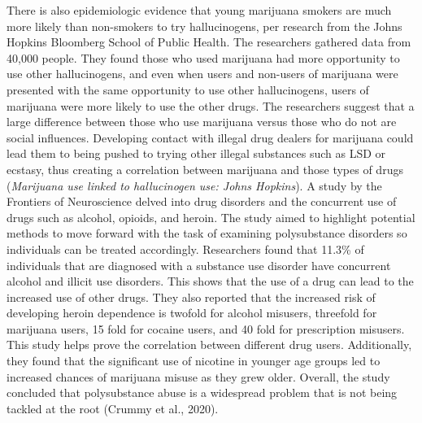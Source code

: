 \documentclass{article}
\begin{document}
There is also epidemiologic evidence that young marijuana smokers are much more likely than non-smokers to try hallucinogens, per research from the Johns Hopkins Bloomberg School of Public Health. The researchers gathered data from 40,000 people. They found those who used marijuana had more opportunity to use other hallucinogens, and even when users and non-users of marijuana were presented with the same opportunity to use other hallucinogens, users of marijuana were more likely to use the other drugs. The researchers suggest that a large difference between those who use marijuana versus those who do not are social influences. Developing contact with illegal drug dealers for marijuana could lead them to being pushed to trying other illegal substances such as LSD or ecstasy, thus creating a correlation between marijuana and those types of drugs ({\it Marijuana use linked to hallucinogen use: Johns Hopkins}).	
A study by the Frontiers of Neuroscience delved into drug disorders and the concurrent use of drugs such as alcohol, opioids, and heroin. The study aimed to highlight potential methods to move forward with the task of examining polysubstance disorders so individuals can be treated accordingly. Researchers found that 11.3\% of individuals that are diagnosed with a substance use disorder have concurrent alcohol and illicit use disorders. This shows that the use of a drug can lead to the increased use of other drugs. They also reported that the increased risk of developing heroin dependence is twofold for alcohol misusers, threefold for marijuana users, 15 fold for cocaine users, and 40 fold for prescription misusers. This study helps prove the correlation between different drug users. Additionally, they found that the significant use of nicotine in younger age groups led to increased chances of marijuana misuse as they grew older. Overall, the study concluded that polysubstance abuse is a widespread problem that is not being tackled at the root (Crummy et al., 2020). 
 

\vspace*{-4mm}
\end{document}
